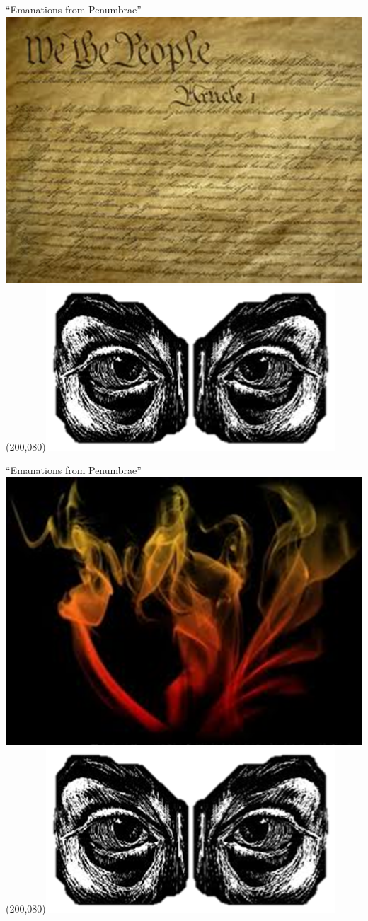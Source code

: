 \begin{frame}{``Emanations from Penumbrae''}
   \centering
   \includegraphics[height=.7\textheight]{img/constitution.png} \\
   \Put(200,080){\includegraphics[width=.4\textwidth]{img/eyes.png}}
\end{frame}

\begin{frame}{``Emanations from Penumbrae''}
   \centering
   \includegraphics[height=.7\textheight]{img/fire.png} \\
   \Put(200,080){\includegraphics[width=.4\textwidth]{img/eyes.png}}
\end{frame}

